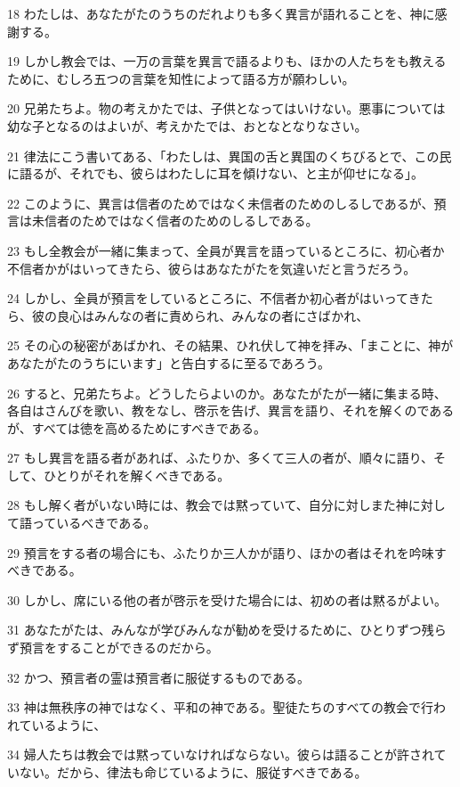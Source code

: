 \par 18 わたしは、あなたがたのうちのだれよりも多く異言が語れることを、神に感謝する。
\par 19 しかし教会では、一万の言葉を異言で語るよりも、ほかの人たちをも教えるために、むしろ五つの言葉を知性によって語る方が願わしい。
\par 20 兄弟たちよ。物の考えかたでは、子供となってはいけない。悪事については幼な子となるのはよいが、考えかたでは、おとなとなりなさい。
\par 21 律法にこう書いてある、「わたしは、異国の舌と異国のくちびるとで、この民に語るが、それでも、彼らはわたしに耳を傾けない、と主が仰せになる」。
\par 22 このように、異言は信者のためではなく未信者のためのしるしであるが、預言は未信者のためではなく信者のためのしるしである。
\par 23 もし全教会が一緒に集まって、全員が異言を語っているところに、初心者か不信者かがはいってきたら、彼らはあなたがたを気違いだと言うだろう。
\par 24 しかし、全員が預言をしているところに、不信者か初心者がはいってきたら、彼の良心はみんなの者に責められ、みんなの者にさばかれ、
\par 25 その心の秘密があばかれ、その結果、ひれ伏して神を拝み、「まことに、神があなたがたのうちにいます」と告白するに至るであろう。
\par 26 すると、兄弟たちよ。どうしたらよいのか。あなたがたが一緒に集まる時、各自はさんびを歌い、教をなし、啓示を告げ、異言を語り、それを解くのであるが、すべては徳を高めるためにすべきである。
\par 27 もし異言を語る者があれば、ふたりか、多くて三人の者が、順々に語り、そして、ひとりがそれを解くべきである。
\par 28 もし解く者がいない時には、教会では黙っていて、自分に対しまた神に対して語っているべきである。
\par 29 預言をする者の場合にも、ふたりか三人かが語り、ほかの者はそれを吟味すべきである。
\par 30 しかし、席にいる他の者が啓示を受けた場合には、初めの者は黙るがよい。
\par 31 あなたがたは、みんなが学びみんなが勧めを受けるために、ひとりずつ残らず預言をすることができるのだから。
\par 32 かつ、預言者の霊は預言者に服従するものである。
\par 33 神は無秩序の神ではなく、平和の神である。聖徒たちのすべての教会で行われているように、
\par 34 婦人たちは教会では黙っていなければならない。彼らは語ることが許されていない。だから、律法も命じているように、服従すべきである。
